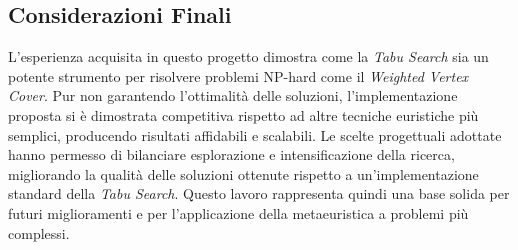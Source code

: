 \subsection{Considerazioni Finali}

L'esperienza acquisita in questo progetto dimostra come la \textit{Tabu Search} sia un potente strumento per risolvere problemi NP-hard come il \textit{Weighted Vertex Cover}. Pur non garantendo l'ottimalità delle soluzioni, l'implementazione proposta si è dimostrata competitiva rispetto ad altre tecniche euristiche più semplici, producendo risultati affidabili e scalabili.
Le scelte progettuali adottate hanno permesso di bilanciare esplorazione e intensificazione della ricerca, migliorando la qualità delle soluzioni ottenute rispetto a un'implementazione standard della \textit{Tabu Search}. Questo lavoro rappresenta quindi una base solida per futuri miglioramenti e per l’applicazione della metaeuristica a problemi più complessi.

